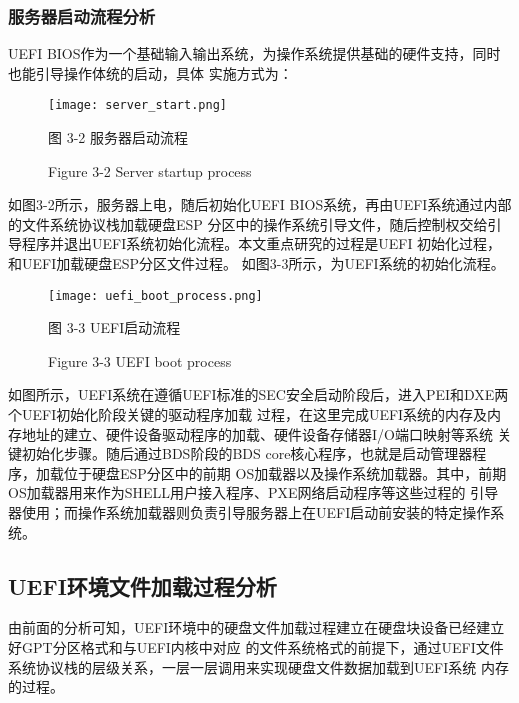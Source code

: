 \subsubsection{服务器启动流程分析}
UEFI BIOS作为一个基础输入输出系统，为操作系统提供基础的硬件支持，同时也能引导操作体统的启动，具体
实施方式为：

\begin{figure}[htb]
    \vspace{0cm}   
    \setlength{\abovecaptionskip}{0.3cm}  
	\centering
    \texttt{[image: server\_start.png]}
    \caption*{图 3-2 服务器启动流程}
    \setlength{\belowcaptionskip}{-0.7cm}
    \caption*{Figure 3-2 Server startup process}
\end{figure}

如图3-2所示，服务器上电，随后初始化UEFI BIOS系统，再由UEFI系统通过内部的文件系统协议栈加载硬盘ESP
分区中的操作系统引导文件，随后控制权交给引导程序并退出UEFI系统初始化流程。本文重点研究的过程是UEFI
初始化过程，和UEFI加载硬盘ESP分区文件过程。
如图3-3所示，为UEFI系统的初始化流程。

\begin{figure}[htb]
    \vspace{0cm}   
    \setlength{\abovecaptionskip}{0.3cm}  
	\centering
    \texttt{[image: uefi\_boot\_process.png]}
    \caption*{图 3-3 UEFI启动流程}
    \setlength{\belowcaptionskip}{-0.7cm}
    \caption*{Figure 3-3 UEFI boot process}
\end{figure}

如图所示，UEFI系统在遵循UEFI标准的SEC安全启动阶段后，进入PEI和DXE两个UEFI初始化阶段关键的驱动程序加载
过程，在这里完成UEFI系统的内存及内存地址的建立、硬件设备驱动程序的加载、硬件设备存储器I/O端口映射等系统
关键初始化步骤。随后通过BDS阶段的BDS core核心程序，也就是启动管理器程序，加载位于硬盘ESP分区中的前期
OS加载器以及操作系统加载器。其中，前期OS加载器用来作为SHELL用户接入程序、PXE网络启动程序等这些过程的
引导器使用；而操作系统加载器则负责引导服务器上在UEFI启动前安装的特定操作系统。

\subsection{UEFI环境文件加载过程分析}
由前面的分析可知，UEFI环境中的硬盘文件加载过程建立在硬盘块设备已经建立好GPT分区格式和与UEFI内核中对应
的文件系统格式的前提下，通过UEFI文件系统协议栈的层级关系，一层一层调用来实现硬盘文件数据加载到UEFI系统
内存的过程。

